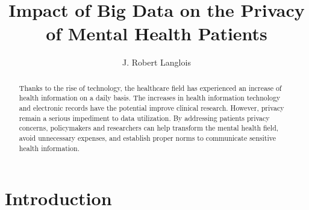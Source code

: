 \documentclass[sigconf]{acmart}
\begin{document}
\title{Impact of Big Data on the Privacy of Mental Health Patients}


\author{J. Robert Langlois}

\begin{abstract}
Thanks to the rise of technology, the healthcare field has experienced an increase of health information on a daily basis. The increases in health information technology and electronic records have the potential improve clinical research. However, privacy remain a serious impediment to data utilization. By addressing patients privacy concerns, policymakers and researchers can help transform the mental health field, avoid unnecessary expenses, and establish proper norms to communicate sensitive health information.  
\end{abstract}



\maketitle

\section{Introduction}
\end{document}
